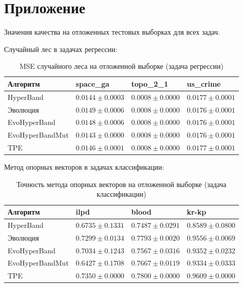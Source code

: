 \documentclass[a4paper,12pt]{article}
\begin{document}
\newpage
\section{Приложение}
Значения качества на отложенных тестовых выборках для всех задач.

Случайный лес в задачах регрессии:
\begin{table}[h]
\centering
\begin{tabular}{|l|l|l|l|}
\hline
Алгоритм        & space\_ga                     & topo\_2\_1            & us\_crime                     \\ \hline
HyperBand       & $0.0144 \pm 0.0003$          & $0.0008 \pm 0.0000$ & $0.0177 \pm 0.0001$          \\ \hline
Эволюция        & $0.0149 \pm 0.0006$          & $0.0008 \pm 0.0000$ & $\mathbf{0.0176 \pm 0.0001}$ \\ \hline
EvoHyperBand    & $0.0148 \pm 0.0006$          & $0.0008 \pm 0.0000$ & $\mathbf{0.0176 \pm 0.0001}$ \\ \hline
EvoHyperBandMut & $\mathbf{0.0143 \pm 0.0000}$ & $0.0008 \pm 0.0000$ & $\mathbf{0.0176 \pm 0.0001}$ \\ \hline
TPE             & $0.0146 \pm 0.0001$          & $0.0008 \pm 0.0000$ & $0.0177 \pm 0.0001$          \\ \hline
\end{tabular}
\caption{MSE случайного леса на отложенной выборке (задача регрессии)}
\label{tab:rf_regr_test}
\end{table}

Метод опорных векторов в задачах классификации:
\begin{table}[h]
\centering
\begin{tabular}{|l|l|l|l|}
\hline
Алгоритм        & ilpd              & blood             & kr-kp             \\ \hline
HyperBand       & $0.6735 \pm 0.1331$ & $0.7487 \pm 0.0291$ & $0.8589 \pm 0.0800$ \\ \hline
Эволюция        & $0.7299 \pm 0.0134$ & $0.7793 \pm 0.0020$ & $0.9556 \pm 0.0069$ \\ \hline
EvoHyperBand    & $0.7034 \pm 0.1243$ & $0.7567 \pm 0.0316$ & $0.9352 \pm 0.0232$ \\ \hline
EvoHyperBandMut & $0.6427 \pm 0.1708$ & $0.7667 \pm 0.0119$ & $0.9334 \pm 0.0333$ \\ \hline
TPE             & $\mathbf{0.7350 \pm 0.0000}$ & $\mathbf{0.7800 \pm 0.0000}$ & $\mathbf{0.9609 \pm 0.0000}$ \\ \hline
\end{tabular}
\caption{Точность метода опорных векторов на отложенной выборке (задача классификации)}
\label{tab:svm_test}
\end{table}
\end{document}
